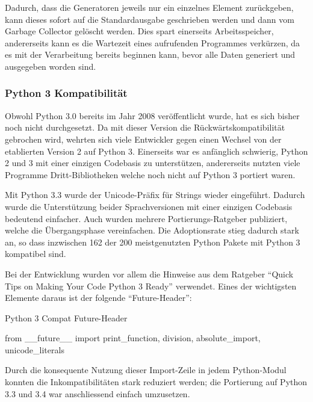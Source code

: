 
Dadurch, dass die Generatoren jeweils nur ein einzelnes Element zurückgeben,
kann dieses sofort auf die Standardausgabe geschrieben werden und dann vom
Garbage Collector gelöscht werden. Dies spart einerseits Arbeitsspeicher,
andererseits kann es die Wartezeit eines aufrufenden Programmes verkürzen, da es
mit der Verarbeitung bereits beginnen kann, bevor alle Daten generiert und
ausgegeben worden sind.

\subsubsection{Python 3 Kompatibilität}

Obwohl Python 3.0 bereits im Jahr 2008 veröffentlicht wurde, hat es sich bisher
noch nicht durchgesetzt. Da mit dieser Version
die Rückwärtskompatibilität gebrochen wird, wehrten sich viele Entwickler
gegen einen Wechsel von der etablierten Version 2 auf Python 3. Einerseits
war es anfänglich schwierig, Python 2 und 3 mit einer einzigen Codebasis zu
unterstützen, andererseits nutzten viele Programme Dritt-Bibliotheken welche
noch nicht auf Python 3 portiert waren.

Mit Python 3.3 wurde der Unicode-Präfix für Strings wieder eingeführt\cite{PEP414:2012}.
Dadurch wurde die Unterstützung beider Sprachversionen mit einer
einzigen Codebasis bedeutend einfacher. Auch wurden mehrere
Portierungs-Ratgeber publiziert, welche die Übergangsphase
vereinfachen\cite{regebro2013porting, ronacher2013porting}. Die Adoptionsrate
stieg dadurch stark an, so dass inzwischen 162 der 200 meistgenutzten Python
Pakete mit Python 3 kompatibel sind\cite{py3adoption}.

Bei der Entwicklung wurden vor allem die Hinweise aus dem Ratgeber
\enquote{Quick Tips on Making Your Code Python 3 Ready}\cite{deshev2012porting}
verwendet. Eines der wichtigsten Elemente daraus ist der folgende
\enquote{Future-Header}:

\begin{listing}[H]
\caption{Python 3 Compat Future-Header}
\begin{pythoncode}
from __future__ import print_function, division, absolute_import, unicode_literals
\end{pythoncode}
\end{listing}

Durch die konsequente Nutzung dieser Import-Zeile in jedem Python-Modul konnten
die Inkompatibilitäten stark reduziert werden; die Portierung auf Python 3.3 und
3.4 war anschliessend einfach umzusetzen.

